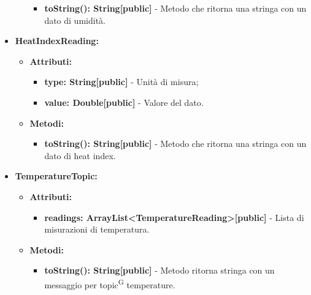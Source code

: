 \documentclass[8pt]{article}
\newcommand{\glossterm}[1]{#1\textsuperscript{G}} %
\begin{document}
\begin{itemize}
\begin{itemize}
        \begin{itemize}
	\setlength\itemsep{0em}
            \item \textbf{toString(): String[public]} - Metodo che ritorna una stringa con un dato di umidità.
        \end{itemize}
    \end{itemize}
    \item \textbf{HeatIndexReading:}
    \begin{itemize}
	\setlength\itemsep{0em}
        \item \textbf{Attributi:}
        \begin{itemize}
	\setlength\itemsep{0em}
            \item \textbf{type: String[public]} - Unità di misura;
            \item \textbf{value: Double[public]} - Valore del dato.
        \end{itemize}
    \end{itemize}
    \begin{itemize}
	\setlength\itemsep{0em}
        \item \textbf{Metodi:}
        \begin{itemize}
	\setlength\itemsep{0em}
            \item \textbf{toString(): String[public]} - Metodo che ritorna una stringa con un dato di heat index.
        \end{itemize}
    \end{itemize}
    \item \textbf{TemperatureTopic:}
    \begin{itemize}
	\setlength\itemsep{0em}
        \item \textbf{Attributi:}
        \begin{itemize}
	\setlength\itemsep{0em}
            \item \textbf{readings: ArrayList<TemperatureReading>[public]} - Lista di misurazioni di temperatura.
        \end{itemize}
    \end{itemize}
    \begin{itemize}
	\setlength\itemsep{0em}
        \item \textbf{Metodi:}
        \begin{itemize}
	\setlength\itemsep{0em}
            \item \textbf{toString(): String[public]} - Metodo ritorna stringa con un messaggio per \glossterm{topic} temperature.
        \end{itemize}

\end{itemize}
\end{itemize}
\end{document}
